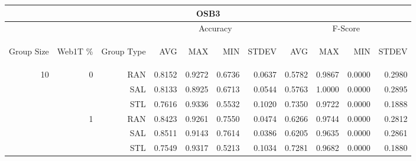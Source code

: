 \begin{center}
\begin{table}[htbp] 
 \begin{center}
\begin{tabular}{ | r | r | r | r | r | r | r | r | r | r | r |}
\hline
\multicolumn{11}{|c|}{OSB3}\\
\hline
 & & & \multicolumn{4}{|c|}{Accuracy} & \multicolumn{4}{|c|}{F-Score}\\ \cline{4-11}
\begin{sideways}Group Size\end{sideways} & \begin{sideways}Web1T \%\end{sideways} & \begin{sideways}Group Type\end{sideways} & \begin{sideways}AVG\end{sideways} & \begin{sideways}MAX\end{sideways} & \begin{sideways}MIN\end{sideways} & \begin{sideways}STDEV\end{sideways} & \begin{sideways}AVG\end{sideways} & \begin{sideways}MAX\end{sideways} & \begin{sideways}MIN\end{sideways} & \begin{sideways}STDEV\end{sideways}\\
\hline
\multirow{18}{*}{10}
 & \multirow{3}{*}{0} & RAN & 0.8152 & 0.9272 & 0.6736 & 0.0637 & 0.5782 & 0.9867 & 0.0000 & 0.2980\\ \cline{3-11}
 &   & SAL & 0.8133 & 0.8925 & 0.6713 & 0.0544 & 0.5763 & 1.0000 & 0.0000 & 0.2895\\ \cline{3-11}
 &   & STL & 0.7616 & 0.9336 & 0.5532 & 0.1020 & 0.7350 & 0.9722 & 0.0000 & 0.1888\\ \cline{2-11}
 & \multirow{3}{*}{1} & RAN & 0.8423 & 0.9261 & 0.7550 & 0.0474 & 0.6266 & 0.9744 & 0.0000 & 0.2812\\ \cline{3-11}
 &   & SAL & 0.8511 & 0.9143 & 0.7614 & 0.0386 & 0.6205 & 0.9635 & 0.0000 & 0.2861\\ \cline{3-11}
 &   & STL & 0.7549 & 0.9317 & 0.5213 & 0.1034 & 0.7281 & 0.9682 & 0.0000 & 0.1880\\ \cline{2-11}

\end{tabular}
\end{center}
\end{table}
\end{center}
